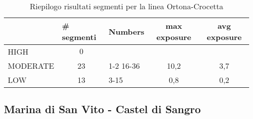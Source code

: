\begin{table}[hbt]
	\centering
	\begin{tabular}{|l|c|l|c|c|}
		\hline \rowcolor{lightgray}
		& \multicolumn{1}{l|}{\# segmenti} & Numbers   & max exposure & avg exposure \\ 
		\hline \rowcolor{flamingopink}
				HIGH     & $0$                                       &           &              &              \\ 
		\hline \rowcolor{icterine}
				MODERATE & 23                                      & 1-2 16-36 & 10,2  & 3,7  \\ 
		\hline \rowcolor{inchworm}
		LOW      & 13                                      & 3-15      & 0,8 & 0,2  \\ 
		\hline
	\end{tabular}
	\caption{Riepilogo risultati segmenti per la linea Ortona-Crocetta}
\end{table}
\subsection{Marina di San Vito - Castel di Sangro}
\label{app:sanvitocasteldisangro}
\centering

